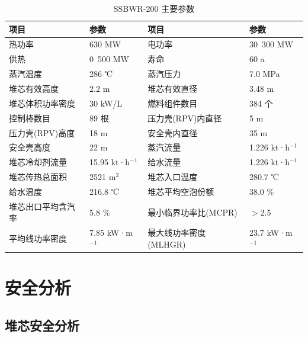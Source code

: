 \documentclass{article}
\begin{document}
\begin{table}[ht]
    \centering
    \caption{SSBWR-200 主要参数}
    \label{tab:ssbwr_200_main_parameters}
    \begin{tabular}{llll}
        \toprule
        项目 & 参数 & 项目 & 参数 \\
        \midrule
        热功率 & 630 MW & 电功率 & 30~300 MW \\
        供热 & 0~500 MW & 寿命 & 60 a \\
        蒸汽温度 & 286 ℃ & 蒸汽压力 & 7.0 MPa \\
        堆芯有效高度 & 2.2 m & 堆芯有效直径 & 3.48 m \\
        堆芯体积功率密度 & 30 kW/L & 燃料组件数目 & 384 个 \\
        控制棒数目 & 89 根 & 压力壳(RPV)内直径 & 5 m \\
        压力壳(RPV)高度 & 18 m & 安全壳内直径 & 35 m \\
        安全壳高度 & 22 m & 蒸汽流量 & 1.226 kt·h$^{-1}$ \\
        堆芯冷却剂流量 & 15.95 kt·h$^{-1}$ & 给水流量 & 1.226 kt·h$^{-1}$ \\
        堆芯传热总面积 & 2521 m$^{2}$ & 堆芯入口温度 & 280.7 ℃ \\
        给水温度 & 216.8 ℃ & 堆芯平均空泡份额 & 38.0 \% \\
        堆芯出口平均含汽率 & 5.8 \% & 最小临界功率比(MCPR) & $>$2.5 \\
        平均线功率密度 & 7.85 kW·m$^{-1}$ & 最大线功率密度(MLHGR) & 23.7 kW·m$^{-1}$ \\
        \bottomrule
    \end{tabular}
\end{table}

\section{安全分析}

\subsection{堆芯安全分析}
\end{document}
